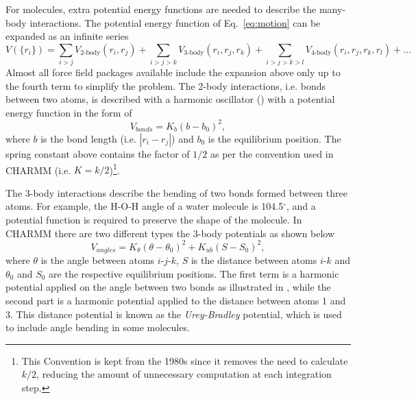 For molecules, extra potential energy functions are needed to describe the many-body interactions. 
The potential energy function of Eq.~\eqref{eq:motion} can be expanded as an infinite series
\begin{equation}
V(\{r_{i}\}) = \sum_{i>j}V_{\text{2-body}}(r_{i},r_{j}) + \sum_{i>j>k}V_{\text{3-body}}(r_{i},r_{j},r_{k}) + \sum_{i>j>k>l}V_{\text{4-body}}(r_{i},r_{j},r_{k},r_{l}) + ...
\end{equation}
Almost all force field packages available include the expansion above only up to the fourth 
term to simplify the problem. The 2-body interactions, i.e. bonds between two atoms, is 
described with a harmonic oscillator () with a potential energy 
function in the form of
\begin{equation}
V_{bonds} = K_{b}(b-b_{0})^2,
\end{equation}
where $b$ is the bond length (i.e. $|r_{i}-r_{j}|$) and $b_{0}$ is the equilibrium position. 
The spring constant above contains the factor of $1/2$ as per the convention used in CHARMM 
(i.e. $K = k/2$)\footnote{This Convention is kept from the 1980s since it removes the need 
to calculate $k/2$, reducing the amount of unnecessary computation at each integration step.}. 

The 3-body interactions describe the bending of two bonds formed between three atoms. For 
example, the H-O-H angle of a water molecule is 104.5$^{\circ}$, and a potential function is 
required to preserve the shape of the molecule. In CHARMM there are two different types the 
3-body potentials as shown below
\begin{equation}
V_{angles} = K_{\theta}(\theta-\theta_{0})^2 + K_{ub}(S-S_{0})^2,
\end{equation}
where $\theta$ is the angle between atoms $i$-$j$-$k$, $S$ is the distance between atoms 
$i$-$k$ and $\theta_{0}$ and $S_{0}$ are the respective equilibrium positions. The first 
term is a harmonic potential applied on the angle between two bonds as illustrated in 
, while the second part is a harmonic potential applied to the 
distance between atoms 1 and 3. This distance potential is known as the {\it Urey-Bradley} 
potential, which is used to include angle bending in some molecules. 

